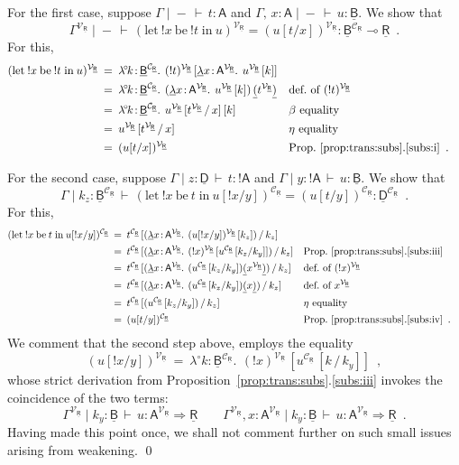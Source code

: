 \documentclass{LMCS}
\newcommand{\comptype}[1]{\underline{#1}}
\newcommand{\VA}{\mathsf{A}}
\newcommand{\CB}{\comptype{\mathsf{B}}}
\newcommand{\CD}{\comptype{\mathsf{D}}}
\newcommand{\CR}{\comptype{\mathsf{R}}}
\newcommand{\lpop}{\multimap}
\newcommand{\Cfun}{\Rightarrow}
\newcommand{\Cbang}[1]{{! #1}}
\newcommand{\In}[2]{#1 \colon  \! #2}
\newcommand{\rIn}[2]{#1 \colon  #2}
\newcommand{\Cj}[4]{#1 \mid  \! #2 \, \vdash \, \rIn{#3}{#4}}
\newcommand{\Vj}[3]{\Cj{#1}{{-}}{#2}{#3}}
\newcommand{\Ceq}[5]{#1 \mid  \! #2 \, \vdash \, #3 = #4 \colon #5}
\newcommand{\Veq}[4]{\Ceq{#1}{-}{#2}{#3}{#4}}
\newcommand{\compop}[1]{\underline{#1}}
\newcommand{\Clam}[3]{\compop{\lambda} \In{#1}{#2}.\: #3}
\newcommand{\Cappl}[2]{#1\compop{(}#2\compop{)}}
\newcommand{\bang}[1]{{! #1}}
\newcommand{\banglet}[3]{\mathrm{let}\: {\bang #1}\:\mathrm{be}\:{#2} \;\mathrm{in}\: #3}
\newcommand{\llambda}{\lambda^{\!\circ\!}}
\newcommand{\llam}[3]{\llambda \In{#1}{#2}.\: #3}
\newcommand{\lappl}[2]{#1[#2]}
\newcommand{\CpsVT}[1]{#1^{\mathcal{V}_{\CR}}}
\newcommand{\CpsCT}[1]{#1^{\mathcal{C}_{\CR}}}
\begin{document}
For the first case, suppose $\Vj{\Gamma}{t}{\VA}$ and $\Vj{\Gamma,\, \In{x}{\VA}}{u}{\CB}$.
We show that
\[
\Veq{\CpsVT{\Gamma}}{\CpsVT{(\banglet{x}{\bang{t}}{u})}}{\CpsVT{(u[t/x])}}{\CpsCT{\CB} \lpop \CR} \enspace .
\]
For this,
\begin{align*}
\CpsVT{(\banglet{x}{\bang{t}}{u})} \:
&  = \: \llam{k}{\CpsCT{\CB}}
   {\,\lappl{\CpsVT{(\bang{t})}\,}{\Clam{x}{\CpsVT{\VA}}{\,\lappl{\CpsVT{u}\,}{k}}}}
\\
& = \:
\llam{k}{\CpsCT{\CB}}
   {\,\Cappl{(\Clam{x}{\CpsVT{\VA}}{\,\lappl{\CpsVT{u}\,}{k}})\,}{\CpsVT{t}}}
 && \text{def.~of $\CpsVT{(\bang{t})}$}
\\
& = \:\llam{k}{\CpsCT{\CB}}
   {\,\lappl{\CpsVT{u}\,[\CpsVT{t}\,/\, x]\,}{k}}
 && \text{$\beta$ equality}
\\
& = \: {\CpsVT{u}\,[\CpsVT{t}\,/\, x]\,}
 && \text{$\eta$ equality}
\\
& = \: \CpsVT{(u[t/x])}
 && \text{Prop.~\ref{prop:trans:subs}.\ref{subs:i}} \enspace .
\end{align*}

For the second case, 
suppose $\Cj{\Gamma}{\In{z}{\CD}}{t}{\Cbang{\VA}}$ and $\Cj{\Gamma}{\In{y}{\Cbang{\VA}}}{u}{\CB}$.
We show that 
\[\Ceq{\Gamma}{\In{k_z}{\CpsCT{\CB}}}{\CpsCT{(\banglet{x}{t}{u[\bang{x}/y]})}}{\CpsCT{(u[t / y])}}{\CpsCT{\CD}}
\enspace .\]
For this,
\begin{align*}
\CpsCT{(\banglet{x}{t}{u[\bang{x}/y]})} \:
& = \: \CpsCT{t}\,[(\Clam{x}{\CpsVT{\VA}}{\,\lappl{\CpsVT{(u[\bang{x}/y])}\,}{k_z}})\, / \, k_z]
\\
& = \: \CpsCT{t}\,[(\Clam{x}{\CpsVT{\VA}}{\,\lappl{\CpsVT{(\bang{x})}\,}{\CpsCT{u} \,[k_z/k_y]}})\, / \, k_z]
 && \text{Prop.~\ref{prop:trans:subs}.\ref{subs:iii}}
\\
& = \: \CpsCT{t}\,[(\Clam{x}{\CpsVT{\VA}}{\, \Cappl{(\CpsCT{u} \,[k_z/k_y])}{\CpsVT{x}}})
\, / \, k_z]
 && \text{def.~of $\CpsVT{(\bang{x})}$}
\\
& = \: \CpsCT{t}\,[(\Clam{x}{\CpsVT{\VA}}{\, \Cappl{(\CpsCT{u} \,[k_z/k_y])}{x}})
\, / \, k_z]
 && \text{def.~of $\CpsVT{x}$}
\\
& = \: \CpsCT{t}\,[(\CpsCT{u} \,[k_z/k_y]) \, / \, k_z]
 && \text{$\eta$ equality}
\\
& = \: \CpsCT{(u[t / y])}
 && \text{Prop.~\ref{prop:trans:subs}.\ref{subs:iv}} \enspace .
\end{align*}
We comment that the second step above, employs the equality
\[\CpsVT{(u[\bang{x}/y])} \: = \:
\llam{k}{\CpsCT{\CB}}{\,\lappl{\CpsVT{(\bang{x})}\,}{\CpsCT{u}\,[k\,/\,k_y]}} \enspace ,
\]
whose strict derivation from Proposition~\ref{prop:trans:subs}.\ref{subs:iii} 
invokes the coincidence of the two terms:
\[\Cj{\CpsVT{\Gamma}}{\In{k_y}{\CB}}{u}{\CpsVT{\VA} \Cfun \CR} 
\qquad
\Cj{\CpsVT{\Gamma}, \In{x}{\CpsVT{\VA}}}{\In{k_y}{\CB}}{u}{\CpsVT{\VA} \Cfun \CR} 
\enspace .\]
Having made this point once, we shall not comment further on such small issues arising from weakening.
\qed
\end{document}
